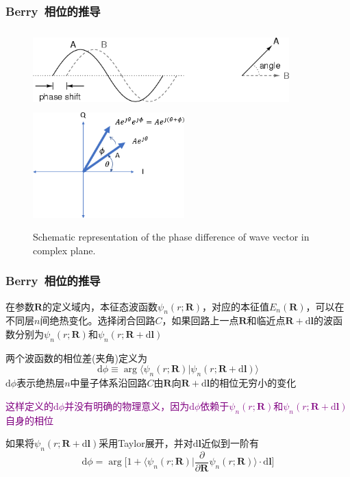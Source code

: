 \frame
{
	\frametitle{\textrm{Berry~}相位的推导}
\begin{figure}[h!]
\centering
\vspace*{-0.25in}
\includegraphics[height=1.2in,width=3.9in,viewport=0 0 125 35,clip]{Figures/complex_phase-shift.png}
\includegraphics[height=1.6in,width=2.3in,viewport=0 0 360 240,clip]{Figures/complex_phase-difference.png}
\caption{\tiny \textrm{Schematic representation of the phase difference of wave vector in complex plane.}}%
\label{Complex-Phase-difference}
\end{figure} 
}

\frame
{
	\frametitle{\textrm{Berry~}相位的推导}
	在参数$\mathbf{R}$的定义域内，本征态波函数$\psi_n(r;\mathbf{R})$，对应的本征值$E_n(\mathbf{R})$，可以在不同层$n$间绝热变化。选择闭合回路$C$，如果回路上一点$\mathbf{R}$和临近点$\mathbf{R}+\mathrm{d}\mathbf{l}$的波函数分别为$\psi_n(r;\mathbf{R})$和$\psi_n(r;\mathbf{R}+\mathrm{d}\mathbf{l})$

	两个波函数的相位差(夹角)定义为
	\begin{displaymath}
		\mathrm{d}\phi\equiv\arg\langle\psi_n(r;\mathbf{R})|\psi_n(r;\mathbf{R}+\mathrm{d}\mathbf{l})\rangle
	\end{displaymath}
	$\mathrm{d}\phi$表示绝热层$n$中量子体系沿回路$C$由$\mathbf{R}$向$\mathbf{R}+\mathrm{d}\mathbf{l}$的相位无穷小的变化

	\textcolor{purple}{这样定义的$\mathrm{d}\phi$并没有明确的物理意义，因为$\mathrm{d}\phi$依赖于$\psi_n(r;\mathbf{R})$和$\psi_n(r;\mathbf{R}+\mathrm{d}\mathbf{l})$自身的相位}

	如果将$\psi_n(r;\mathbf{R}+\mathrm{d}\mathbf{l})$采用\textrm{Taylor}展开，并对$\mathrm{d}\mathbf{l}$近似到一阶有
	\begin{displaymath}
		\mathrm{d}\phi=\arg\bigg[1+\langle\psi_n(r;\mathbf{R})|\dfrac{\partial}{\partial\mathbf{R}}\psi_n(r;\mathbf{R})\rangle\cdot\mathrm{d}\mathbf{l}\bigg]
	\end{displaymath}
}

